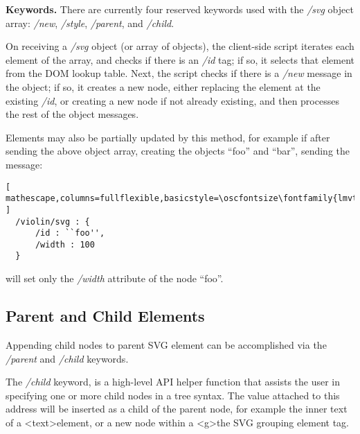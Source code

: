 
\medskip
\noindent
\textbf{Keywords.} 
There are currently four reserved keywords used with the \textit{/svg} object array: \textit{/new}, \textit{/style}, \textit{/parent}, and \textit{/child}.

On receiving a \textit{/svg} object (or array of objects), the client-side script iterates each element of the array, and checks if there is an \textit{/id} tag; if so, it selects that element from the DOM lookup table.
Next, the script checks if there is a \textit{/new} message in the object; if so, it creates a new node, either replacing the element at the existing \textit{/id}, or creating a new node if not already existing, and then processes the rest of the object messages.

Elements may also be partially updated by this method, for example if after sending the above object array, creating the objects ``foo'' and ``bar'', sending the message:

\begin{minipage}{\linewidth}
\begin{lstlisting}[ mathescape,columns=fullflexible,basicstyle=\oscfontsize\fontfamily{lmvtt}\selectfont ]
  /violin/svg : {
      /id : ``foo'',
      /width : 100
  }
  \end{lstlisting}
\end{minipage}

\noindent
will set only the \textit{/width} attribute of the node ``foo''.

\subsection{Parent and Child Elements}\label{sec:parent}
Appending child nodes to parent SVG element can be accomplished via the \textit{/parent} and \textit{/child} keywords.

The \textit{/child} keyword, is a high-level API helper function that assists the user in specifying one or more child nodes in a tree syntax.
The value attached to this address will be inserted as a child of the parent node, for example the inner text of a \textless text\textgreater element, or a new node within a \textless g\textgreater the SVG grouping element tag.

